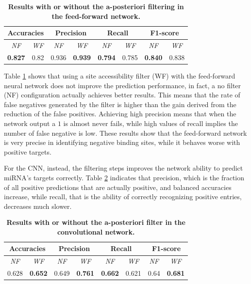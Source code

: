 \begin{table}
	\caption{\textbf{Results with or without the a-posteriori filtering in the feed-forward network.}}
	\label{tab:ff_sa_filter}
	\centering
	\begin{tabular}{| c | c | c | c | c | c | c | c |} \hline
		\multicolumn{2}{|c|}{\textbf{Accuracies}} & \multicolumn{2}{c|}{\textbf{Precision}} & \multicolumn{2}{c|}{\textbf{Recall}} & \multicolumn{2}{c|}{\textbf{F1-score}} \\ \hline 
		\emph{NF} & \emph{WF} & \emph{NF} & \emph{WF} & \emph{NF} & \emph{WF} & \emph{NF} & \emph{WF} \\ \hline
		\textbf{0.827} & 0.82 & 0.936 & \textbf{0.939} & \textbf{0.794} & 0.785 & \textbf{0.840} & 0.838 \\ \hline
		
	\end{tabular}
\end{table}

Table \ref{tab:ff_sa_filter} shows that using a site accessibility filter (WF) with the feed-forward neural network does not improve the prediction performance, in fact, a no filter (NF) configuration actually achieves better results. This means that the rate of false negatives generated by the filter is higher than the gain derived from the reduction of the false positives. Achieving high precision means that when the network output a $1$ is almost never fails, while high values of recall implies the number of false negative is low. These results show that the feed-forward network is very precise in identifying negative binding sites, while it behaves worse with positive targets.  

For the CNN, instead, the filtering steps improves the network ability to predict miRNA's targets correctly. Table \ref{tab:cnn_sa_filter} indicates that precision, which is the fraction of all positive predictions that are actually positive, and balanced accuracies increase, while recall, that is the ability of correctly recognizing positive entries, decreases much slower. 

\begin{table}[hb!]
	\caption{\textbf{Results with or without the a-posteriori filter in the convolutional network.}}
	\label{tab:cnn_sa_filter}
	\centering
	\begin{tabular}{| c | c | c | c | c | c | c | c |} \hline
		\multicolumn{2}{|c|}{\textbf{Accuracies}} & \multicolumn{2}{c|}{\textbf{Precision}} & \multicolumn{2}{c|}{\textbf{Recall}} & \multicolumn{2}{c|}{\textbf{F1-score}} \\ \hline 
		\emph{NF} & \emph{WF} & \emph{NF} & \emph{WF} & \emph{NF} & \emph{WF} & \emph{NF} & \emph{WF} \\ \hline
		0.628 & \textbf{0.652} & 0.649 & \textbf{0.761} & \textbf{0.662} & 0.621 & 0.64 & \textbf{0.681} \\ \hline
		
	\end{tabular}
\end{table}

